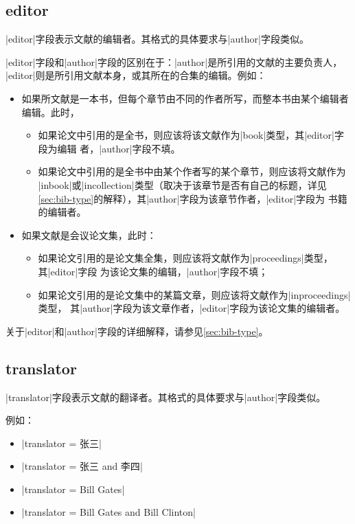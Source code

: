 \subsection{editor}\label{subsec:editor}

|editor|字段表示文献的编辑者。其格式的具体要求与|author|字段类似。

|editor|字段和|author|字段的区别在于：|author|是所引用的文献的主要负责人，
|editor|则是所引用文献本身，或其所在的合集的编辑。例如：
\begin{itemize}
\item 如果所文献是一本书，但每个章节由不同的作者所写，而整本书由某个编辑者编辑。此时，
  \begin{itemize}
  \item 如果论文中引用的是全书，则应该将该文献作为|book|类型，其|editor|字段为编辑
    者，|author|字段不填。
  \item 如果论文中引用的是全书中由某个作者写的某个章节，则应该将文献作为
    |inbook|或|incollection|类型（取决于该章节是否有自己的标题，详见
    \ref{sec:bib-type}的解释），其|author|字段为该章节作者，|editor|字段为
    书籍的编辑者。
  \end{itemize}
\item 如果文献是会议论文集，此时：
  \begin{itemize}
  \item 如果论文引用的是论文集全集，则应该将文献作为|proceedings|类型，其|editor|字段
    为该论文集的编辑，|author|字段不填；
  \item 如果论文引用的是论文集中的某篇文章，则应该将文献作为|inproceedings|类型，
    其|author|字段为该文章作者，|editor|字段为该论文集的编辑者。
  \end{itemize}
\end{itemize}

关于|editor|和|author|字段的详细解释，请参见\ref{sec:bib-type}。

\subsection{translator}\label{subsec:translator}

|translator|字段表示文献的翻译者。其格式的具体要求与|author|字段类似。

例如：
\begin{itemize}
\item |translator = {张三}|
\item |translator = {张三 and 李四}|
\item |translator = {Bill Gates}|
\item |translator = {Bill Gates and Bill Clinton}|
\end{itemize}

